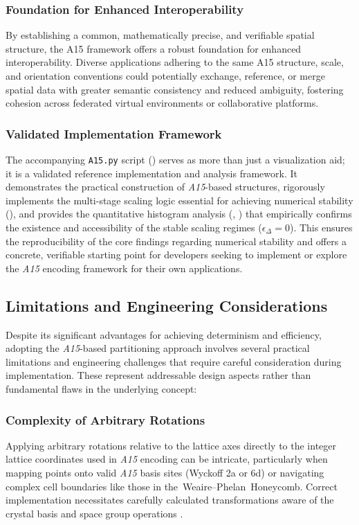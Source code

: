 \documentclass[10pt]{article}
\def\AAAB{\textit{A15}}
\def\WP{Weaire--Phelan}
\def\tWPH{the~\WP{}~Honeycomb}
\begin{document}
\subsubsection{Foundation for Enhanced Interoperability}\label{subsubsec-benefits-interoperability}
By establishing a common, mathematically precise, and verifiable spatial structure, the A15 framework offers a robust foundation for enhanced interoperability. Diverse applications adhering to the same A15 structure, scale, and orientation conventions could potentially exchange, reference, or merge spatial data with greater semantic consistency and reduced ambiguity, fostering cohesion across federated virtual environments or collaborative platforms.

\subsubsection{Validated Implementation Framework}\label{subsubsec-benefits-validation}
The accompanying \texttt{A15.py} script () serves as more than just a visualization aid; it is a validated reference implementation and analysis framework. It demonstrates the practical construction of \AAAB{}-based structures, rigorously implements the multi-stage scaling logic essential for achieving numerical stability (), and provides the quantitative histogram analysis (, ) that empirically confirms the existence and accessibility of the stable scaling regimes ($\epsilon_\Delta = 0$). This ensures the reproducibility of the core findings regarding numerical stability and offers a concrete, verifiable starting point for developers seeking to implement or explore the \AAAB{} encoding framework for their own applications.

\subsection{Limitations and Engineering Considerations}\label{subsec-discussion-limits}

Despite its significant advantages for achieving determinism and efficiency, adopting the \AAAB{}-based partitioning approach involves several practical limitations and engineering challenges that require careful consideration during implementation. These represent addressable design aspects rather than fundamental flaws in the underlying concept:

\subsubsection{Complexity of Arbitrary Rotations}\label{subsubsec-limits-symmetry}
Applying arbitrary rotations relative to the lattice axes directly to the integer lattice coordinates used in \AAAB{} encoding can be intricate, particularly when mapping points onto valid \AAAB{} basis sites (Wyckoff 2a or 6d) or navigating complex cell boundaries like those in \tWPH{}. Correct implementation necessitates carefully calculated transformations aware of the crystal basis and space group operations \cite{ITCVolumeA2016}.
\end{document}

